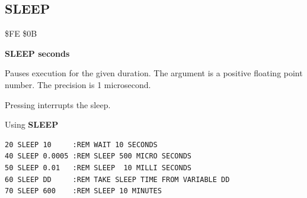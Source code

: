 
\newpage
\subsection{SLEEP}
\begin{description}[leftmargin=2cm,style=nextline]
\item [Token:] \$FE \$0B
\item [Format:] {\bf SLEEP seconds}
\item [Usage:] Pauses execution for the given duration. The argument is a
               positive floating point number.
               The precision is 1 microsecond.
\item [Remarks:] Pressing  interrupts the sleep.

\item [Example:] Using {\bf SLEEP}
\begin{tcolorbox}[colback=black,coltext=white]
\verbatimfont{\codefont}
\begin{verbatim}
20 SLEEP 10     :REM WAIT 10 SECONDS
40 SLEEP 0.0005 :REM SLEEP 500 MICRO SECONDS
50 SLEEP 0.01   :REM SLEEP  10 MILLI SECONDS
60 SLEEP DD     :REM TAKE SLEEP TIME FROM VARIABLE DD
70 SLEEP 600    :REM SLEEP 10 MINUTES
\end{verbatim}
\end{tcolorbox}
\end{description}


\newpage
